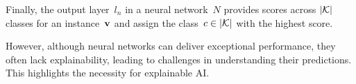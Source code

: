 %
Finally, the output layer~$l_n$ in a neural network~$N$ provides scores across
$|{\mathcal{K}}|$ classes for an instance~$\mathbf{v}$ and assign the class~$c \in |{\mathcal{K}}|$
with the highest score.

However, although neural networks can deliver exceptional performance, they often lack
explainability, leading to challenges in understanding their predictions.
%
This highlights the necessity for explainable AI.
